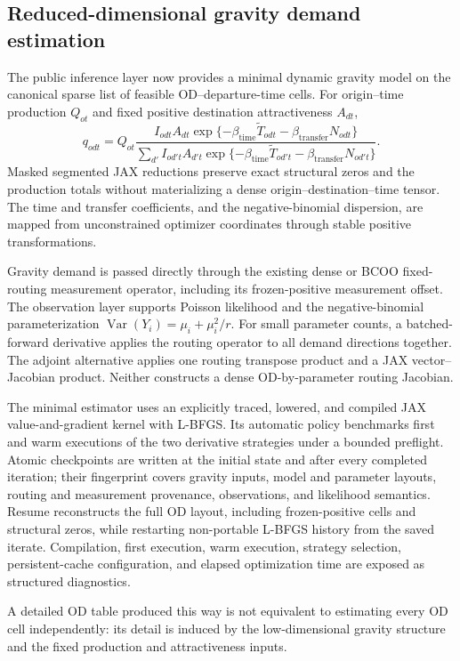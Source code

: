 \subsection{Reduced-dimensional gravity demand estimation}

The public inference layer now provides a minimal dynamic gravity model on the
canonical sparse list of feasible OD--departure-time cells.  For origin--time
production $Q_{ot}$ and fixed positive destination attractiveness $A_{dt}$,
\[
 q_{odt}=Q_{ot}\frac{I_{odt}A_{dt}
 \exp\{-\beta_{\mathrm{time}}\widetilde T_{odt}
       -\beta_{\mathrm{transfer}}N_{odt}\}}
 {\sum_{d'}I_{od't}A_{d't}
 \exp\{-\beta_{\mathrm{time}}\widetilde T_{od't}
       -\beta_{\mathrm{transfer}}N_{od't}\}}.
\]
Masked segmented JAX reductions preserve exact structural zeros and the
production totals without materializing a dense origin--destination--time
tensor.  The time and transfer coefficients, and the negative-binomial
dispersion, are mapped from unconstrained optimizer coordinates through stable
positive transformations.

Gravity demand is passed directly through the existing dense or BCOO
fixed-routing measurement operator, including its frozen-positive measurement
offset.  The observation layer supports Poisson likelihood and the
negative-binomial parameterization
$\operatorname{Var}(Y_i)=\mu_i+\mu_i^2/r$.  For small parameter counts, a
batched-forward derivative applies the routing operator to all demand
directions together.  The adjoint alternative applies one routing transpose
product and a JAX vector--Jacobian product.  Neither constructs a dense
OD-by-parameter routing Jacobian.

The minimal estimator uses an explicitly traced, lowered, and compiled JAX
value-and-gradient kernel with L-BFGS.  Its automatic policy benchmarks first
and warm executions of the two derivative strategies under a bounded
preflight.  Atomic checkpoints are written at the initial state and after every
completed iteration; their fingerprint covers gravity inputs, model and
parameter layouts, routing and measurement provenance, observations, and
likelihood semantics.  Resume reconstructs the full OD layout, including
frozen-positive cells and structural zeros, while restarting non-portable
L-BFGS history from the saved iterate.  Compilation, first execution, warm
execution, strategy selection, persistent-cache configuration, and elapsed
optimization time are exposed as structured diagnostics.

A detailed OD table produced this way is not equivalent to estimating every OD
cell independently: its detail is induced by the low-dimensional gravity
structure and the fixed production and attractiveness inputs.

